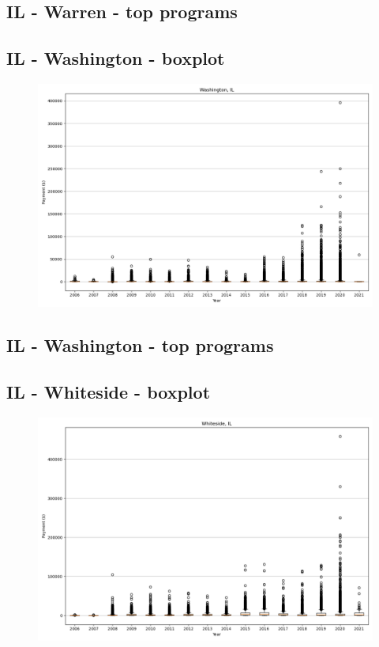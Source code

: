 \subsection*{IL - Warren - top programs}

\newpage
\subsection*{IL - Washington - boxplot}
\begin{figure}[h]
\centering
\includegraphics[width=7in]{../output/boxplots/counties/Washington-IL_boxplot.png}
\end{figure}


\subsection*{IL - Washington - top programs}

\newpage
\subsection*{IL - Whiteside - boxplot}
\begin{figure}[h]
\centering
\includegraphics[width=7in]{../output/boxplots/counties/Whiteside-IL_boxplot.png}
\end{figure}



